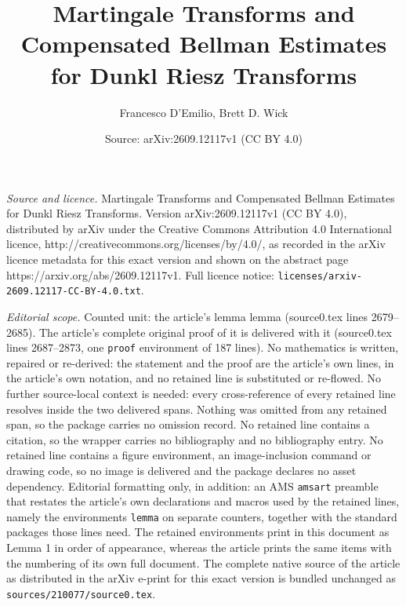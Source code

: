 \documentclass[10pt,a4paper]{amsart}
\title{Martingale Transforms and Compensated Bellman Estimates for Dunkl Riesz Transforms}
\author{Francesco D'Emilio, Brett D. Wick}
\date{Source: arXiv:2609.12117v1 (CC BY 4.0)}
\newtheorem{lemma}{Lemma}
\newcommand{\R}{\mathbb{R}}
\begin{document}
\maketitle

\noindent\emph{Source and licence.} Martingale Transforms and Compensated Bellman Estimates for Dunkl Riesz Transforms. Version arXiv:2609.12117v1 (CC BY 4.0), distributed by arXiv under the Creative Commons Attribution 4.0 International licence, http://creativecommons.org/licenses/by/4.0/, as recorded in the arXiv licence metadata for this exact version and shown on the abstract page https://arxiv.org/abs/2609.12117v1. Full licence notice: \texttt{licenses/arxiv-2609.12117-CC-BY-4.0.txt}.\par\smallskip

\noindent\textit{Editorial scope.} Counted unit: the article's lemma lemma (source0.tex lines 2679--2685). The article's complete original proof of it is delivered with it (source0.tex lines 2687--2873, one \texttt{proof} environment of 187 lines). No mathematics is written, repaired or re-derived: the statement and the proof are the article's own lines, in the article's own notation, and no retained line is substituted or re-flowed.  No further source-local context is needed: every cross-reference of every retained line resolves inside the two delivered spans.  Nothing was omitted from any retained span, so the package carries no omission record.  No retained line contains a citation, so the wrapper carries no bibliography and no bibliography entry.  No retained line contains a figure environment, an image-inclusion command or drawing code, so no image is delivered and the package declares no asset dependency.  Editorial formatting only, in addition: an AMS \texttt{amsart} preamble that restates the article's own declarations and macros used by the retained lines, namely the environments \texttt{lemma} on separate counters, together with the standard packages those lines need.  The retained environments print in this document as Lemma 1 in order of appearance, whereas the article prints the same items with the numbering of its own full document.  The complete native source of the article as distributed in the arXiv e-print for this exact version is bundled unchanged as \texttt{sources/210077/source0.tex}.
\end{document}
